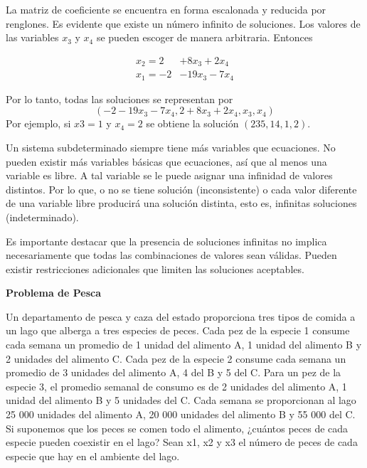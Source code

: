 \documentclass{article}
\begin{document}
La matriz de coeficiente se encuentra en forma escalonada y reducida por renglones. Es evidente que existe un número infinito de soluciones. Los valores de las variables $x_3$ y $x_4$ se pueden escoger de manera arbitraria. Entonces 

\begin{equation*}
    \begin{aligned}
        x_2 = 2 & +8x_3 + 2x_4\\
        x_1 =-2 & -19x_3-7x_4 
    \end{aligned}
\end{equation*}

Por lo tanto, todas las soluciones se representan por $$(-2 -19x_3 -7x_4, 2 + 8x_3 + 2x_4, x_3, x_4)$$ Por ejemplo, si $x3 = 1$ y $x_4 = 2$ se obtiene la solución $(235, 14, 1, 2)$.

\begin{tcolorbox}[colback=green!20!white,colframe=green!80!black,title=Soluciones en un Sistema con más Incógnitas que Ecuaciones]

    Un sistema subdeterminado siempre tiene más variables que ecuaciones. No pueden existir más variables básicas que ecuaciones, así que al menos una variable es libre. A tal variable se le puede asignar una infinidad de valores distintos. Por lo que, o no se tiene solución (inconsistente) o cada valor diferente de una variable libre producirá una solución distinta, esto es, infinitas soluciones (indeterminado).

    Es importante destacar que la presencia de soluciones infinitas no implica necesariamente que todas las combinaciones de valores sean válidas. Pueden existir restricciones adicionales que limiten las soluciones aceptables.
\end{tcolorbox}

\begin{large}
    \textbf{Problema de Pesca}
\end{large}

Un departamento de pesca y caza del estado proporciona tres tipos de comida a un lago que alberga a tres especies de peces. Cada pez de la especie 1 consume cada semana un promedio de 1 unidad del alimento A, 1 unidad del alimento B y 2 unidades del alimento C. Cada pez de la especie 2 consume cada semana un promedio de 3 unidades del alimento A, 4 del B y 5 del C. Para un pez de la especie 3, el promedio semanal de consumo es de 2 unidades del alimento A, 1 unidad del alimento B y 5 unidades del C. Cada semana se proporcionan al lago 25 000 unidades del alimento A, 20 000 unidades del alimento B y 55 000 del C. Si suponemos que los peces se comen todo el alimento, ¿cuántos peces de cada especie pueden coexistir en el lago? Sean x1, x2 y x3 el número de peces de cada especie que hay en el ambiente del lago.
\end{document}
